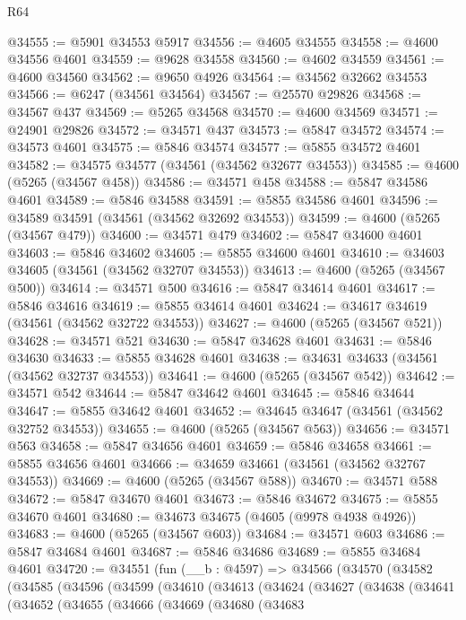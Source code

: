 \begin{lexlean}{R64}
\begin{coremodule}
@34555 := @5901 @34553 @5917
@34556 := @4605 @34555
@34558 := @4600 @34556 @4601
@34559 := @9628 @34558
@34560 := @4602 @34559
@34561 := @4600 @34560
@34562 := @9650 @4926
@34564 := @34562 @32662 @34553
@34566 := @6247 (@34561 @34564)
@34567 := @25570 @29826
@34568 := @34567 @437
@34569 := @5265 @34568
@34570 := @4600 @34569
@34571 := @24901 @29826
@34572 := @34571 @437
@34573 := @5847 @34572
@34574 := @34573 @4601
@34575 := @5846 @34574
@34577 := @5855 @34572 @4601
@34582 := @34575 @34577 (@34561 (@34562 @32677 @34553))
@34585 := @4600 (@5265 (@34567 @458))
@34586 := @34571 @458
@34588 := @5847 @34586 @4601
@34589 := @5846 @34588
@34591 := @5855 @34586 @4601
@34596 := @34589 @34591 (@34561 (@34562 @32692 @34553))
@34599 := @4600 (@5265 (@34567 @479))
@34600 := @34571 @479
@34602 := @5847 @34600 @4601
@34603 := @5846 @34602
@34605 := @5855 @34600 @4601
@34610 := @34603 @34605 (@34561 (@34562 @32707 @34553))
@34613 := @4600 (@5265 (@34567 @500))
@34614 := @34571 @500
@34616 := @5847 @34614 @4601
@34617 := @5846 @34616
@34619 := @5855 @34614 @4601
@34624 := @34617 @34619 (@34561 (@34562 @32722 @34553))
@34627 := @4600 (@5265 (@34567 @521))
@34628 := @34571 @521
@34630 := @5847 @34628 @4601
@34631 := @5846 @34630
@34633 := @5855 @34628 @4601
@34638 := @34631 @34633 (@34561 (@34562 @32737 @34553))
@34641 := @4600 (@5265 (@34567 @542))
@34642 := @34571 @542
@34644 := @5847 @34642 @4601
@34645 := @5846 @34644
@34647 := @5855 @34642 @4601
@34652 := @34645 @34647 (@34561 (@34562 @32752 @34553))
@34655 := @4600 (@5265 (@34567 @563))
@34656 := @34571 @563
@34658 := @5847 @34656 @4601
@34659 := @5846 @34658
@34661 := @5855 @34656 @4601
@34666 := @34659 @34661 (@34561 (@34562 @32767 @34553))
@34669 := @4600 (@5265 (@34567 @588))
@34670 := @34571 @588
@34672 := @5847 @34670 @4601
@34673 := @5846 @34672
@34675 := @5855 @34670 @4601
@34680 := @34673 @34675 (@4605 (@9978 @4938 @4926))
@34683 := @4600 (@5265 (@34567 @603))
@34684 := @34571 @603
@34686 := @5847 @34684 @4601
@34687 := @5846 @34686
@34689 := @5855 @34684 @4601
@34720 := @34551
    (fun (__b : @4597) =>
    @34566
      (@34570
        (@34582
          (@34585
            (@34596
              (@34599
                (@34610
                  (@34613
                    (@34624
                      (@34627
                        (@34638
                          (@34641
                            (@34652
                              (@34655
                                (@34666
                                  (@34669
                                    (@34680
                                      (@34683

\end{coremodule}
\end{lexlean}
